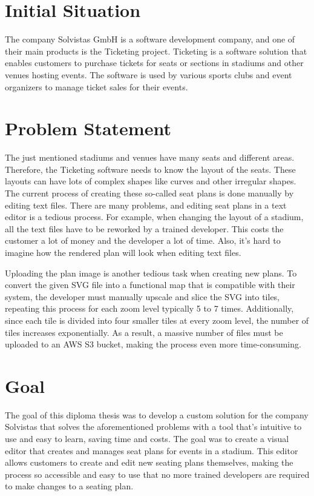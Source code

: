 \section{Initial Situation}
The company Solvistas GmbH is a software development company, and one of their main products is the Ticketing project. Ticketing is a software solution that enables customers to purchase tickets for seats or sections in stadiums and other venues hosting events. The software is used by various sports clubs and event organizers to manage ticket sales for their events.


\section{Problem Statement}
The just mentioned stadiums and venues have many seats and different areas. Therefore, the Ticketing software needs to know the layout of the seats. These layouts can have lots of complex shapes like curves and other irregular shapes. The current process of creating these so-called seat plans is done manually by editing text files. There are many problems, and editing seat plans in a text editor is a tedious process. For example, when changing the layout of a stadium, all the text files have to be reworked by a trained developer. This costs the customer a lot of money and the developer a lot of time. Also, it's hard to imagine how the rendered plan will look when editing text files.

Uploading the plan image is another tedious task when creating new plans. To convert the given SVG file into a functional map that is compatible with their system, the developer must manually upscale and slice the SVG into tiles, repeating this process for each zoom level typically 5 to 7 times. Additionally, since each tile is divided into four smaller tiles at every zoom level, the number of tiles increases exponentially. As a result, a massive number of files must be uploaded to an AWS S3 bucket, making the process even more time-consuming.

\section{Goal}
The goal of this diploma thesis was to develop a custom solution for the company Solvistas that solves the aforementioned problems with a tool that's intuitive to use and easy to learn, saving time and costs. The goal was to create a visual editor that creates and manages seat plans for events in a stadium. This editor allows customers to create and edit new seating plans themselves, making the process so accessible and easy to use that no more trained developers are required to make changes to a seating plan.